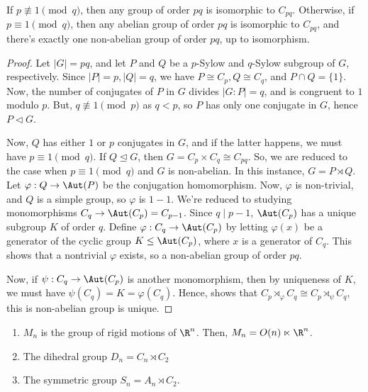 \begin{thm}
    If $p \not \equiv 1 \pmod q$, then any group of order $pq$ is isomorphic to $C_{pq}$. Otherwise, if $p \equiv 1 \pmod q$, then any abelian group of order $pq$ is isomorphic to $C_{pq}$, and there's exactly one non-abelian group of order $pq$, up to isomorphism.
\end{thm}

\begin{proof}
    Let $|G|=pq$, and let $P$ and $Q$ be a $p$-Sylow and $q$-Sylow subgroup of $G$, respectively. Since $|P| = p,|Q|=q$, we have $P \cong C_p,Q \cong C_q$, and $P \cap Q= \{1\}$. Now, the number of conjugates of $P$ in $G$ divides $|G:P|=q$, and is congruent to $1$ modulo $p$. But, $q \not \equiv 1 \pmod p$ as $q<p$, so $P$ has only one conjugate in $G$, hence $P \lhd G$.

    Now, $Q$ has either $1$ or $p$ conjugates in $G$, and if the latter happens, we must have $p \equiv 1 \pmod q$. If $Q \unlhd G$, then $G= C_p \times C_q \cong C_{pq}$. So, we are reduced to the case when $p \equiv 1 \pmod q$ and $G$ is non-abelian. In this instance, $G = P \rtimes Q$. Let $\varphi : Q \to \Aut (P)$ be the conjugation homomorphism. Now, $\varphi$ is non-trivial, and $Q$ is a simple group, so $\varphi$ is $1-1$. We're reduced to studying monomorphisms  $C_q \to \Aut( C_p)=C_{p-1}$. Since $q \mid p-1$, $\Aut(C_p)$ has a unique subgroup $K$ of order $q$. Define $\varphi:C_q \to \Aut (C_p)$ by letting $\varphi(x)$ be a generator of the cyclic group $K \leq \Aut (C_p)$, where $x$ is a generator of $C_q$. This shows that a nontrivial $\varphi$ exists, so a non-abelian group of order $pq$.

    Now, if $\psi :C_q \to \Aut(C_p)$ is another monomorphism, then by uniqueness of $K$, we must have $\psi(C_q) = K = \varphi (C_q)$. Hence,  shows that $C_p \rtimes_\varphi C_q \cong C_p \rtimes _\psi C_q$, this is non-abelian group is unique.
\end{proof}

\begin{ex}
    \begin{enumerate}
        \item $M_n$ is the group of rigid motions of $\R^n$. Then, $M_n = O(n) \ltimes \R^n$.
        \item The dihedral group $D_n = C_n \rtimes C_2$
        \item The symmetric group $S_n=A_n \rtimes C_2$.
    \end{enumerate}
\end{ex}

